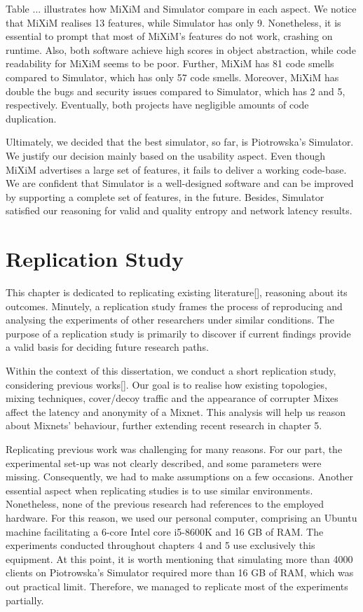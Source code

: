 \documentclass[logo,msc,cyber]{infthesis}   %
\begin{document}
Table ... illustrates how MiXiM and Simulator compare in each aspect. We notice
that MiXiM realises 13 features, while Simulator has only 9. Nonetheless, it is
essential to prompt that most of MiXiM's features do not work, crashing on
runtime. Also, both software achieve high scores in object abstraction, while
code readability for MiXiM seems to be poor. Further, MiXiM has 81 code smells
compared to Simulator, which  has only 57 code smells. Moreover, MiXiM has
double the bugs and security issues compared to Simulator, which has 2 and 5,
respectively. Eventually, both projects have negligible amounts of code
duplication.

Ultimately, we decided that the best simulator, so far, is Piotrowska's
Simulator. We justify our decision mainly based on the usability aspect. Even
though MiXiM advertises a large set of features, it fails to deliver a working
code-base. We are confident that Simulator is a well-designed software and can
be improved by supporting a complete set of features, in the future. Besides,
Simulator satisfied our reasoning for valid and quality entropy and network
latency results. 

\chapter{Replication Study}
This chapter is dedicated to replicating existing literature[], reasoning about
its outcomes. Minutely, a replication study frames the process of reproducing
and analysing the experiments of other researchers under similar conditions. The
purpose of a replication study is primarily to discover if current findings
provide a valid basis for deciding future research paths.

Within the context of this dissertation, we conduct a short replication study,
considering previous works[]. Our goal is to realise how existing topologies,
mixing techniques, cover/decoy traffic and the appearance of corrupter Mixes
affect the latency and anonymity of a Mixnet. This analysis will help us reason
about Mixnets' behaviour, further extending recent research in chapter 5.

Replicating previous work was challenging for many reasons. For our part, the
experimental set-up was not clearly described, and some parameters were missing.
Consequently, we had to make assumptions on a few occasions. Another essential
aspect when replicating studies is to use similar environments. Nonetheless,
none of the previous research had references to the employed hardware. For this
reason, we used our personal computer, comprising an Ubuntu machine facilitating
a 6-core Intel core i5-8600K and 16 GB of RAM. The experiments conducted
throughout chapters 4 and 5 use exclusively this equipment. At this point, it is
worth mentioning that simulating more than 4000 clients on Piotrowska's
Simulator required more than 16 GB of RAM, which was out practical limit.
Therefore, we managed to replicate most of the experiments partially. 
\end{document}
